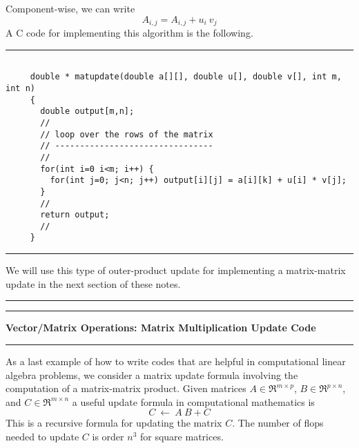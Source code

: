 \documentclass[10pt,fleqn]{article}
\begin{document}
Component-wise, we can write
$$
  A_{i,j} = A_{i,j} + u_i\ v_j
$$
A C code for implementing this algorithm is the following.
\vskip0.1in\hrule\vskip0.1in
\begin{verbatim}

     double * matupdate(double a[][], double u[], double v[], int m, int n)
     {
       double output[m,n];
       //
       // loop over the rows of the matrix
       // --------------------------------
       //
       for(int i=0 i<m; i++) {
         for(int j=0; j<n; j++) output[i][j] = a[i][k] + u[i] * v[j];
       }
       //
       return output;
       //
     }

\end{verbatim}
\vskip0.1in\hrule\vskip0.1in
\noindent
We will use this type of outer-product update for implementing a matrix-matrix
update in the next section of these notes.
\vskip0.1in\hrule\vskip0.1in
\newpage
\vskip0.1in\hrule\vskip0.1in
\noindent
{\bf Vector/Matrix Operations: Matrix Multiplication Update Code}
\vskip0.1in\hrule\vskip0.1in
\noindent
As a last example of how to write codes that are helpful in computational
linear algebra problems, we consider a matrix update formula involving the
computation of a matrix-matrix product. Given matrices $A\in\Re^{m\times p}$,
$B\in\Re^{p\times n}$, and $C\in\Re^{m\times n}$ a useful update formula in
computational mathematics is
$$
  C\ \leftarrow\ A\ B + C
$$
This is a recursive formula for updating the matrix $C$. The number of flops
needed to update $C$ is order $n^3$ for square matrices.
\end{document}
